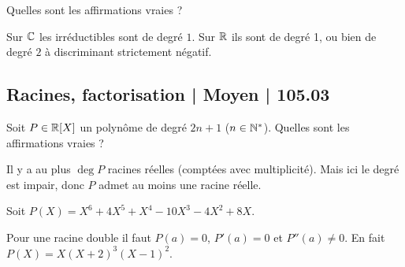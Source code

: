 \begin{question}

Quelles sont les affirmations vraies ?
\begin{answers}



\end{answers}
\begin{explanations}
Sur $\mathbb{C}$ les irréductibles sont de degré $1$. Sur $\mathbb{R}$ ils sont de degré 1, ou bien de degré $2$ à discriminant strictement négatif.
\end{explanations}
\end{question}



\subsection{Racines, factorisation | Moyen | 105.03}


\begin{question}

Soit $P \in \mathbb{R}[X]$ un polynôme de degré $2n+1$ ($n\in\mathbb{N}^*$).
Quelles sont les affirmations vraies ?
\begin{answers}



\end{answers}
\begin{explanations}
Il y a au plus $\deg P$ racines réelles (comptées avec multiplicité). Mais ici le degré est impair, donc $P$ admet au moins une racine réelle.
\end{explanations}
\end{question}


\begin{question}

Soit $P(X) = X^6 + 4 X^5 + X^4 - 10 X^3 - 4 X^2 + 8 X$.
\begin{answers}



\end{answers}
\begin{explanations}
Pour une racine double il faut $P(a)=0$, $P'(a)=0$ et $P''(a)\neq0$.
En fait $P(X) = X(X+2)^3(X-1)^2$.
\end{explanations}
\end{question}





